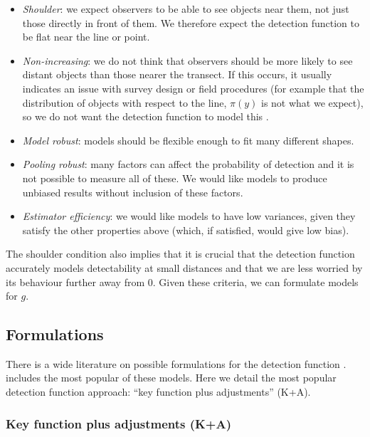 \documentclass[article]{jss}\usepackage[]{graphicx}\usepackage[]{color}
\begin{document}
\begin{itemize}
\item \textit{Shoulder}: we expect observers to be able to see objects near them, not just those directly in front of them. We therefore expect the detection function to be flat near the line or point.
\item \textit{Non-increasing}: we do not think that observers should be more likely to see distant objects than those nearer the transect. If this occurs, it usually indicates an issue with survey design or field procedures (for example that the distribution of objects with respect to the line, $\pi(y)$ is not what we expect), so we do not want the detection function to model this \citep{Marques:2010he, Marques:2012fy, Miller:2015hw}.
\item \textit{Model robust}: models should be flexible enough to fit many different shapes.
\item \textit{Pooling robust}: many factors can affect the probability of detection and it is not possible to measure all of these. We would like models to produce unbiased results without inclusion of these factors.
\item \textit{Estimator efficiency}: we would like models to have low variances, given they satisfy the other properties above (which, if satisfied, would give low bias).
\end{itemize}

The shoulder condition also implies that it is crucial that the detection function accurately models detectability at small distances and that we are less worried by its behaviour further away from 0. Given these criteria, we can formulate models for $g$.

\subsection{Formulations}

There is a wide literature on possible formulations for the detection function \citep{Buckland:1992fa, Eidous:2005bj, Becker:2009cj, Giammarino:2014eg, Miller:2015hw, Becker:2015fi}.  includes the most popular of these models. Here we detail the most popular detection function approach: ``key function plus adjustments'' (K+A).

\subsubsection{Key function plus adjustments (K+A)}
\end{document}
